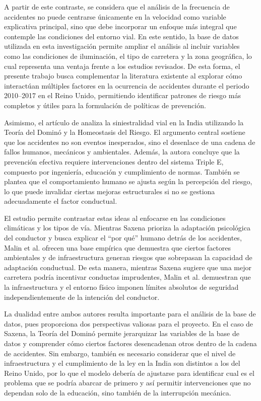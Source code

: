 \documentclass[12pt]{article}
\begin{document}
A partir de este contraste, se considera que el análisis de la frecuencia de accidentes no puede centrarse únicamente en la velocidad como variable explicativa principal, sino que debe incorporar un enfoque más integral que contemple las condiciones del entorno vial. En este sentido, la base de datos utilizada en esta investigación permite ampliar el análisis al incluir variables como las condiciones de iluminación, el tipo de carretera y la zona geográfica, lo cual representa una ventaja frente a los estudios revisados. De esta forma, el presente trabajo busca complementar la literatura existente al explorar cómo interactúan múltiples factores en la ocurrencia de accidentes durante el periodo 2010–2017 en el Reino Unido, permitiendo identificar patrones de riesgo más completos y útiles para la formulación de políticas de prevención.


Asimismo, el artículo de \textcite{SAXENA2017} analiza la siniestralidad vial en la India utilizando la Teoría del Dominó y la Homeostasis del Riesgo. El argumento central sostiene que los accidentes no son eventos inesperados, sino el desenlace de una cadena de fallos humanos, mecánicos y ambientales. Además, la autora concluye que la prevención efectiva requiere intervenciones dentro del sistema Triple E, compuesto por ingeniería, educación y cumplimiento de normas. También se plantea que el comportamiento humano se ajusta según la percepción del riesgo, lo que puede invalidar ciertas mejoras estructurales si no se gestiona adecuadamente el factor conductual.


El estudio \textcite{MALIN2019} permite contrastar estas ideas al enfocarse en las condiciones climáticas y los tipos de vía. Mientras Saxena prioriza la adaptación psicológica del conductor y busca explicar el “por qué” humano detrás de los accidentes, Malin et al. ofrecen una base empírica que demuestra que ciertos factores ambientales y de infraestructura generan riesgos que sobrepasan la capacidad de adaptación conductual. De esta manera, mientras Saxena sugiere que una mejor carretera podría incentivar conductas imprudentes, Malin et al. demuestran que la infraestructura y el entorno físico imponen límites absolutos de seguridad independientemente de la intención del conductor.


La dualidad entre ambos autores resulta importante para el análisis de la base de datos, pues proporciona dos perspectivas valiosas para el proyecto. En el caso de Saxena, la Teoría del Dominó permite jerarquizar las variables de la base de datos y comprender cómo ciertos factores desencadenan otros dentro de la cadena de accidentes. Sin embargo, también es necesario considerar que el nivel de infraestructura y el cumplimiento de la ley en la India son distintos a los del Reino Unido, por lo que el modelo debería de ajustarse para identificar cual es el problema que se podría abarcar de primero y así permitir intervenciones que no 
dependan solo de la educación, sino también de la interrupción mecánica.
\end{document}
